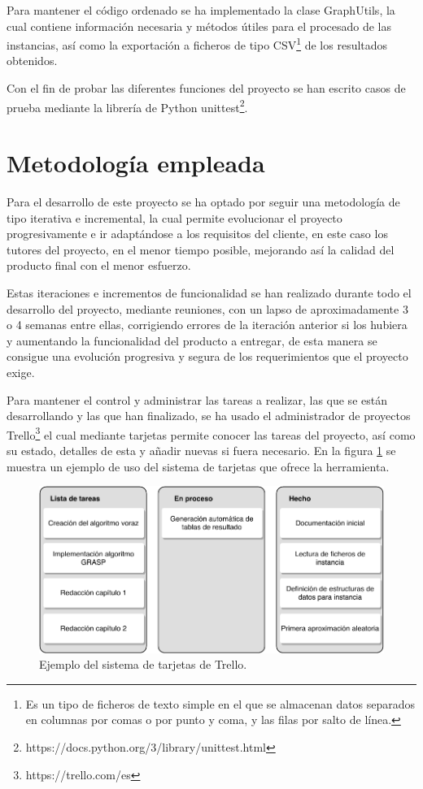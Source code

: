 Para mantener el código ordenado se ha implementado la clase GraphUtils, la cual contiene información necesaria y métodos útiles para el procesado de las instancias, así como la exportación a ficheros de tipo CSV\footnote{Es un tipo de ficheros de texto simple en el que se almacenan datos separados en columnas por comas o por punto y coma, y las filas por salto de línea.} de los resultados obtenidos.

Con el fin de probar las diferentes funciones del proyecto se han escrito casos de prueba mediante la librería de Python unittest\footnote{https://docs.python.org/3/library/unittest.html}.

\section{Metodología empleada}
Para el desarrollo de este proyecto se ha optado por seguir una metodología de tipo iterativa e incremental, la cual permite evolucionar el proyecto progresivamente e ir adaptándose a los requisitos del cliente, en este caso los tutores del proyecto, en el menor tiempo posible, mejorando así la calidad del producto final con el menor esfuerzo.

Estas iteraciones e incrementos de funcionalidad se han realizado durante todo el desarrollo del proyecto, mediante reuniones, con un lapso de aproximadamente 3 o 4 semanas entre ellas, corrigiendo errores de la iteración anterior si los hubiera y aumentando la funcionalidad del producto a entregar, de esta manera se consigue una evolución progresiva y segura de los requerimientos que el proyecto exige.

Para mantener el control y administrar las tareas a realizar, las que se están desarrollando y las que han finalizado, se ha usado el administrador de proyectos Trello\footnote{https://trello.com/es} el cual mediante tarjetas permite conocer las tareas del proyecto, así como su estado, detalles de esta y añadir nuevas si fuera necesario. En la figura \ref{fig:trello-tarjetas} se muestra un ejemplo de uso del sistema de tarjetas que ofrece la herramienta.

\begin{figure}[H]
	\centering
	\includegraphics{Figures/trello-tarjetas.pdf}
	\caption{Ejemplo del sistema de tarjetas de Trello.}
	\label{fig:trello-tarjetas}
\end{figure}

